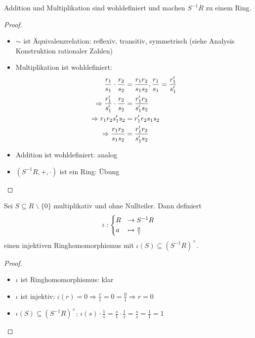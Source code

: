 \begin{lemma}
	Addition und Multiplikation sind wohldefiniert und machen $S^{-1}R$ zu einem Ring.
\end{lemma}

\begin{proof}
	\begin{itemize}
	\item $\sim$ ist Äquivalenzrelation: reflexiv, transitiv, symmetrisch (siehe Analysis Konstruktion rationaler Zahlen)
	\item Multiplikation ist wohldefiniert:
	\begin{align}
	\frac{r_1}{s_1} \cdot \frac{r_2}{s_2} &= \frac{r_1 r_2}{s_1 s_2}, \frac{r_1}{s_1} = \frac{r_1'}{s_1'}\notag \\
	\Rightarrow \frac{r_1'}{s_1'} \cdot \frac{r_2}{s_2} &= \frac{r_1' r_2}{s_1' s_2}\notag \\
	\Rightarrow r_1 r_2 s_1' s_2 &= r_1' r_2 s_1 s_2\notag \\
	\Rightarrow \frac{r_1 r_2}{s_1 s_2} &= \frac{r_1' r_2}{s_1' s_2}\notag
	\end{align}
	\item Addition ist wohldefiniert: analog
	\item $(S^{-1}R, + ,\cdot)$ ist ein Ring: Übung
	\end{itemize}
\end{proof}

\begin{proposition}
	Sei $S \subseteq R \backslash \{0\}$ multiplikativ und ohne Nullteiler. Dann definiert
	\begin{align}
		\iota: \begin{cases}
			R &\to S^{-1}R \\
			a &\mapsto \frac{a}{1}
		\end{cases}\notag
	\end{align}
	einen injektiven Ringhomomorphismus mit $\iota(S) \subseteq (S^{-1}R)^{\times}$.
\end{proposition}

\begin{proof}
	\begin{itemize}
	\item $\iota$ ist Ringhomomorphismus: klar
	\item $\iota$ ist injektiv: $\iota(r) = 0 \Rightarrow \frac{r}{1} = 0 = \frac{0}{1} \Rightarrow r = 0$
	\item $\iota(S) \subseteq (S^{-1}R)^{\times}$: $\iota(s)\cdot \frac{1}{s} = \frac{s}{1} \cdot \frac{1}{s} = \frac{s}{s} = \frac{1}{1} = 1$
	\end{itemize}
\end{proof}

